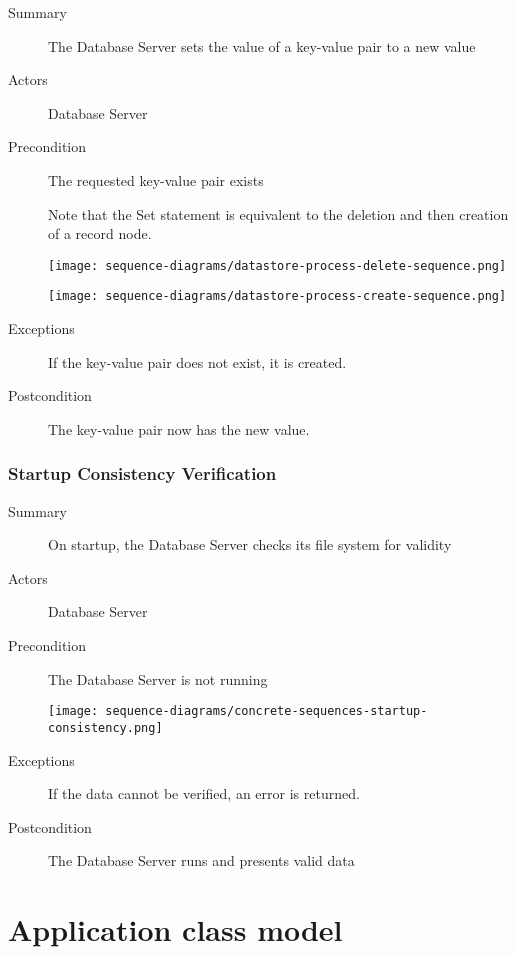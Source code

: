 \documentclass[a4paper]{report}
\begin{document}
	\begin{description}
		\item[Summary] The Database Server sets the value of a key-value pair to a new value
		\item[Actors] Database Server
		\item[Precondition] The requested key-value pair exists

		Note that the Set statement is equivalent to the deletion and then creation of a record node.

		\begin{center}
			\texttt{[image: sequence-diagrams/datastore-process-delete-sequence.png]}
		\end{center}
		\begin{center}
			\texttt{[image: sequence-diagrams/datastore-process-create-sequence.png]}
		\end{center}

		\item[Exceptions] If the key-value pair does not exist, it is created.
		\item[Postcondition] The key-value pair now has the new value.
	\end{description}

	\pagebreak
	
	\subsection{Startup Consistency Verification}

	\begin{description}
		\item[Summary] On startup, the Database Server checks its file system for validity
		\item[Actors] Database Server
		\item[Precondition] The Database Server is not running

		\begin{center}
			\texttt{[image: sequence-diagrams/concrete-sequences-startup-consistency.png]}
		\end{center}

		\item[Exceptions] If the data cannot be verified, an error is returned.
		\item[Postcondition] The Database Server runs and presents valid data
	\end{description}

\chapter{Application class model}
\end{document}
